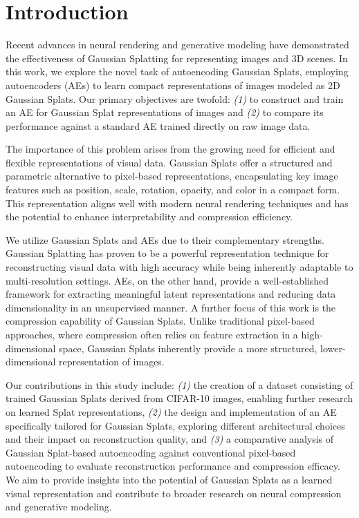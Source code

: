 \section{Introduction}
\label{sec:introduction}

Recent advances in neural rendering and generative modeling have demonstrated the effectiveness of Gaussian Splatting for representing images and 3D scenes. In this work, we explore the novel task of autoencoding Gaussian Splats, employing autoencoders (AEs) to learn compact representations of images modeled as 2D Gaussian Splats. Our primary objectives are twofold: \textit{(1)} to construct and train an AE for Gaussian Splat representations of images and \textit{(2)} to compare its performance against a standard AE trained directly on raw image data. 

The importance of this problem arises from the growing need for efficient and flexible representations of visual data. Gaussian Splats offer a structured and parametric alternative to pixel-based representations, encapsulating key image features such as position, scale, rotation, opacity, and color in a compact form. This representation aligns well with modern neural rendering techniques and has the potential to enhance interpretability and compression efficiency.

We utilize Gaussian Splats and AEs due to their complementary strengths. Gaussian Splatting has proven to be a powerful representation technique for reconstructing visual data with high accuracy while being inherently adaptable to multi-resolution settings. AEs, on the other hand, provide a well-established framework for extracting meaningful latent representations and reducing data dimensionality in an unsupervised manner. A further focus of this work is the compression capability of Gaussian Splats. Unlike traditional pixel-based approaches, where compression often relies on feature extraction in a high-dimensional space, Gaussian Splats inherently provide a more structured, lower-dimensional representation of images.

Our contributions in this study include: \textit{(1)} the creation of a dataset consisting of trained Gaussian Splats derived from CIFAR-10 images, enabling further research on learned Splat representations, \textit{(2)} the design and implementation of an AE specifically tailored for Gaussian Splats, exploring different architectural choices and their impact on reconstruction quality, and \textit{(3)} a comparative analysis of Gaussian Splat-based autoencoding against conventional pixel-based autoencoding to evaluate reconstruction performance and compression efficacy. We aim to provide insights into the potential of Gaussian Splats as a learned visual representation and contribute to broader research on neural compression and generative modeling.

